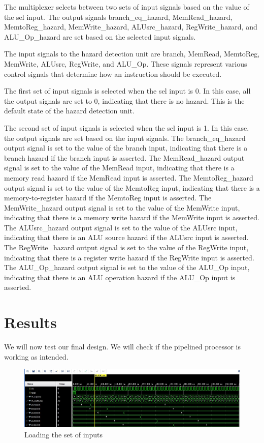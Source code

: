 \documentclass{article}
\begin{document}
The multiplexer selects between two sets of input signals based on the value of the sel input. The output signals branch\_eq\_hazard, MemRead\_hazard, MemtoReg\_hazard, MemWrite\_hazard, ALUsrc\_hazard, RegWrite\_hazard, and ALU\_Op\_hazard are set based on the selected input signals.

The input signals to the hazard detection unit are branch, MemRead, MemtoReg, MemWrite, ALUsrc, RegWrite, and ALU\_Op. These signals represent various control signals that determine how an instruction should be executed.

The first set of input signals is selected when the sel input is 0. In this case, all the output signals are set to 0, indicating that there is no hazard. This is the default state of the hazard detection unit.

The second set of input signals is selected when the sel input is 1. In this case, the output signals are set based on the input signals. The branch\_eq\_hazard output signal is set to the value of the branch input, indicating that there is a branch hazard if the branch input is asserted. The MemRead\_hazard output signal is set to the value of the MemRead input, indicating that there is a memory read hazard if the MemRead input is asserted. The MemtoReg\_hazard output signal is set to the value of the MemtoReg input, indicating that there is a memory-to-register hazard if the MemtoReg input is asserted. The MemWrite\_hazard output signal is set to the value of the MemWrite input, indicating that there is a memory write hazard if the MemWrite input is asserted. The ALUsrc\_hazard output signal is set to the value of the ALUsrc input, indicating that there is an ALU source hazard if the ALUsrc input is asserted. The RegWrite\_hazard output signal is set to the value of the RegWrite input, indicating that there is a register write hazard if the RegWrite input is asserted. The ALU\_Op\_hazard output signal is set to the value of the ALU\_Op input, indicating that there is an ALU operation hazard if the ALU\_Op input is asserted.

\section{Results}
We will now test our final design. We will check if the pipelined processor is working as intended. 

\begin{figure}[h]
    \centering
    \includegraphics*[width = 13 cm]{loadingvalues.jpeg}
    \caption{Loading the set of inputs}
    \label{fig: label 1}
\end{figure}
\end{document}
